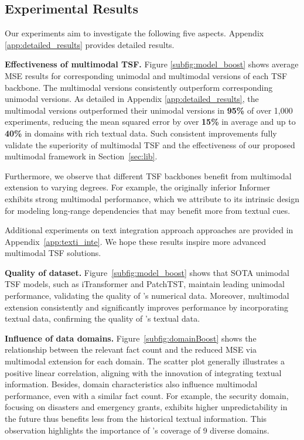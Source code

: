 \subsection{Experimental Results}

Our experiments aim to investigate the following five aspects. Appendix \ref{app:detailed_results} provides detailed results.

\par \noindent \textbf{Effectiveness of multimodal TSF.} Figure \ref{subfig:model_boost} shows average MSE results for corresponding unimodal and multimodal versions of each TSF backbone. The multimodal versions consistently outperform corresponding unimodal versions. As detailed in Appendix \ref{app:detailed_results}, 
the multimodal versions outperformed their unimodal versions in \textbf{95\%} of over 1,000 experiments, reducing the mean squared error by over \textbf{15\%} in average and up to \textbf{40\%} in domains with rich textual data.
Such consistent improvements fully validate the superiority of multimodal TSF and the effectiveness of our proposed multimodal framework in Section~\ref{sec:lib}.

Furthermore, we observe that different TSF backbones benefit from multimodal extension to varying degrees. For example, the originally inferior Informer exhibits strong multimodal performance, which we attribute to its intrinsic design for modeling long-range dependencies that may benefit more from textual cues. 

Additional experiments on text integration approach approaches are provided in Appendix~\ref{app:texti_inte}. We hope these results inspire more advanced multimodal TSF solutions.
\par \noindent \textbf{Quality of \model dataset.} 
Figure~\ref{subfig:model_boost} shows that SOTA unimodal TSF models, such as iTransformer and PatchTST, maintain leading unimodal performance, validating the quality of \model's numerical data. Moreover, multimodal extension consistently and significantly improves performance by incorporating textual data, confirming the quality of \model's textual data.

\par \noindent \textbf{Influence of data domains.} Figure~\ref{subfig:domainBoost} shows the relationship between the relevant fact count and the reduced MSE via multimodal extension for each domain. The scatter plot generally illustrates a positive linear correlation, aligning with the innovation of integrating textual information. Besides, domain characteristics also influence multimodal performance, even with a similar fact count. For example, the security domain, focusing on disasters and emergency grants, exhibits higher unpredictability in the future thus benefits less from the historical textual information. This observation highlights the importance of \model's coverage of 9 diverse domains.

